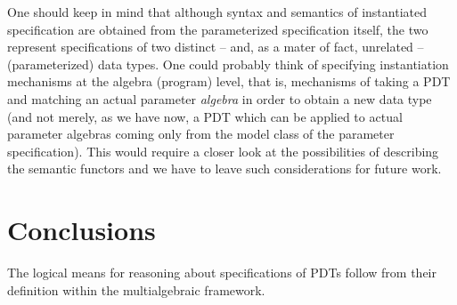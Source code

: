 One should keep in mind that although syntax and semantics of instantiated
specification are obtained from the parameterized specification itself, the
two represent specifications of two distinct -- and, as a mater of fact,
unrelated -- (parameterized) data types. One could probably think of
specifying instantiation mechanisms at the algebra (program) level, that is, mechanisms of taking
a PDT and matching an actual parameter {\em algebra}
in order to
obtain a new data type (and not merely, as we have now, a PDT
 which can be applied to actual parameter algebras coming only from the model
class of the parameter specification). This would require a closer look at
the possibilities of describing the semantic functors and we have to leave such considerations for
future work.




\section{Conclusions}\label{se:conc}
The logical means for reasoning about
specifications of PDTs follow from their definition within the multialgebraic framework.










